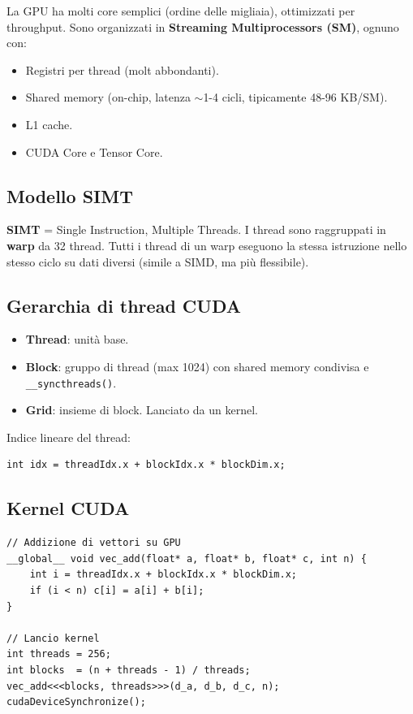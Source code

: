 \documentclass[11pt,a4paper]{article}
\theoremstyle{remark}
\begin{document}
La GPU ha molti core semplici (ordine delle migliaia), ottimizzati per throughput. Sono organizzati in \textbf{Streaming Multiprocessors (SM)}, ognuno con:
\begin{itemize}
  \item Registri per thread (molt abbondanti).
  \item Shared memory (on-chip, latenza $\sim$1-4 cicli, tipicamente 48-96 KB/SM).
  \item L1 cache.
  \item CUDA Core e Tensor Core.
\end{itemize}

\subsection{Modello SIMT}

\textbf{SIMT} = Single Instruction, Multiple Threads. I thread sono raggruppati in \textbf{warp} da 32 thread. Tutti i thread di un warp eseguono la stessa istruzione nello stesso ciclo su dati diversi (simile a SIMD, ma più flessibile).

\subsection{Gerarchia di thread CUDA}

\begin{itemize}
  \item \textbf{Thread}: unità base.
  \item \textbf{Block}: gruppo di thread (max 1024) con shared memory condivisa e \texttt{\_\_syncthreads()}.
  \item \textbf{Grid}: insieme di block. Lanciato da un kernel.
\end{itemize}

Indice lineare del thread:
\begin{lstlisting}
int idx = threadIdx.x + blockIdx.x * blockDim.x;
\end{lstlisting}

\subsection{Kernel CUDA}

\begin{lstlisting}
// Addizione di vettori su GPU
__global__ void vec_add(float* a, float* b, float* c, int n) {
    int i = threadIdx.x + blockIdx.x * blockDim.x;
    if (i < n) c[i] = a[i] + b[i];
}

// Lancio kernel
int threads = 256;
int blocks  = (n + threads - 1) / threads;
vec_add<<<blocks, threads>>>(d_a, d_b, d_c, n);
cudaDeviceSynchronize();
\end{lstlisting}
\end{document}
